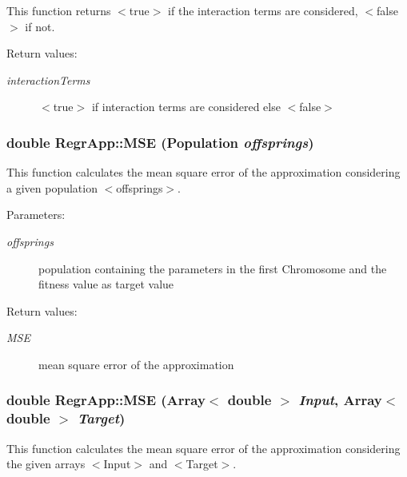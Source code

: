 This function returns $<$true$>$ if the interaction terms are considered, $<$false$>$ if not. 

\begin{Desc}
\item[Return values:]
\begin{description}
\item[{\em interaction\-Terms}]$<$true$>$ if interaction terms are considered else $<$false$>$ \end{description}
\end{Desc}
\subsubsection{\setlength{\rightskip}{0pt plus 5cm}double Regr\-App::MSE (Population {\em offsprings})}\label{classRegrApp_0d2f4648a96dbbc2a10e25e0c340b8ec}


This function calculates the mean square error of the approximation considering a given population $<$offsprings$>$. 

\begin{Desc}
\item[Parameters:]
\begin{description}
\item[{\em offsprings}]population containing the parameters in the first Chromosome and the fitness value as target value \end{description}
\end{Desc}
\begin{Desc}
\item[Return values:]
\begin{description}
\item[{\em MSE}]mean square error of the approximation \end{description}
\end{Desc}
\subsubsection{\setlength{\rightskip}{0pt plus 5cm}double Regr\-App::MSE (Array$<$ double $>$ {\em Input}, Array$<$ double $>$ {\em Target})}\label{classRegrApp_3070339bdbf81658b45a06e86e8592bf}


This function calculates the mean square error of the approximation considering the given arrays $<$Input$>$ and $<$Target$>$. 

